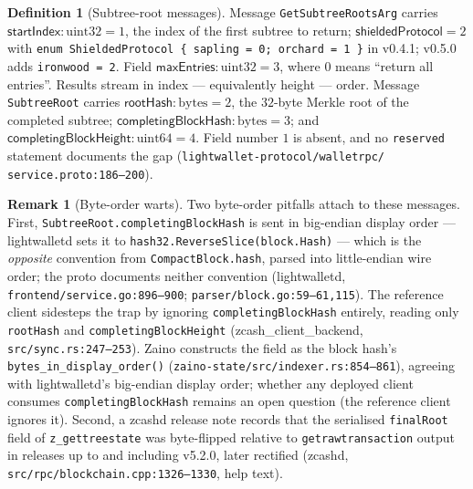 \documentclass[11pt,a4paper]{article}
\theoremstyle{definition}
\newtheorem{definition}[theorem]{Definition}
\newtheorem{remark}[theorem]{Remark}
\begin{document}
\begin{definition}[Subtree-root messages]\label{def:sync-subtreeroot}
Message \texttt{GetSubtreeRootsArg} carries
$\mathsf{startIndex} : \text{uint32} = 1$, the index of the first subtree
to return; $\mathsf{shieldedProtocol} = 2$ with
\texttt{enum ShieldedProtocol \{ sapling = 0; orchard = 1 \}} in v0.4.1;
v0.5.0 adds \texttt{ironwood = 2}. Field
$\mathsf{maxEntries} : \text{uint32} = 3$, where $0$ means
``return all entries''. Results stream in index --- equivalently height
--- order. Message \texttt{SubtreeRoot} carries
$\mathsf{rootHash} : \text{bytes} = 2$, the $32$-byte Merkle root of the
completed subtree; $\mathsf{completingBlockHash} : \text{bytes} = 3$; and
$\mathsf{completingBlockHeight} : \text{uint64} = 4$. Field number $1$ is
absent, and no \texttt{reserved} statement documents the gap
(\texttt{lightwallet-protocol/walletrpc/}\allowbreak
\texttt{service.proto:186--200}).
\end{definition}

\begin{remark}[Byte-order warts]\label{rem:sync-tree-byteorder}
Two byte-order pitfalls attach to these messages. First,
\texttt{SubtreeRoot.\allowbreak completingBlockHash} is sent in big-endian display
order --- \textsf{lightwalletd} sets it to
\texttt{hash32.}\allowbreak\texttt{ReverseSlice(block.Hash)} --- which
is the \emph{opposite}
convention from \texttt{CompactBlock.\allowbreak hash}, parsed into
little-endian
wire order; the proto documents neither convention
(\textsf{lightwalletd}, \texttt{frontend/service.go:896--900};
\texttt{parser/\allowbreak block.go:59--61,115}). The reference client sidesteps the
trap by ignoring \texttt{completing\allowbreak BlockHash} entirely, reading only
\texttt{rootHash} and \texttt{completing\allowbreak BlockHeight}
(\textsf{zcash\_client\_backend}, \texttt{src/\allowbreak sync.rs:247--253}).
Zaino constructs the field as the block hash's
\texttt{bytes\_in\_display\_order()}
(\texttt{zaino-state/src/}\allowbreak\texttt{indexer.rs:854--861}),
agreeing with
\textsf{lightwalletd}'s big-endian display order; whether any deployed
client consumes \texttt{completingBlockHash} remains an open question
(the reference client ignores it).
Second, a \textsf{zcashd} release note records that the serialised
\texttt{finalRoot} field of \texttt{z\_gettreestate} was byte-flipped
relative to \texttt{getrawtransaction} output in releases up to and
including v5.2.0, later rectified
(\textsf{zcashd}, \texttt{src/rpc/blockchain.cpp:1326--1330}, help text).
\end{remark}
\end{document}
